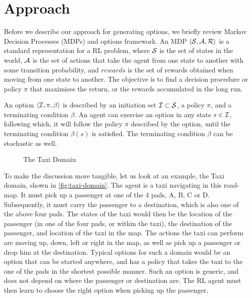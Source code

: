 \section{Approach}
\label{sec:approach}

Before we describe our approach for generating options, we briefly review Markov
Decision Processes (MDPs) and options framework. An MDP $\langle 
    \mathcal{S},\mathcal{A},\mathcal{R}  \rangle$ is a standard representation for a RL problem,
where $\mathcal{S}$ is the set of states in the world, $\mathcal{A}$ is the set of
actions that take the agent from one state to another with some transition
probability, and $rewards$ is the set of rewards obtained when moving from one
state to another. The objective is to find a decision procedure or policy $\pi$
that maximises the return, or the rewards accumulated in the long run. 

An option $\langle  \mathcal{I},\pi,\beta \rangle$ is described by an initiation set $\mathcal{I} \subset
\mathcal{S}$, a policy $\pi$, and a terminating condition $\beta$. An agent can
exercise an option in any state $s \in \mathcal{I}$, following which, it will
follow the policy $\pi$ described by the option, until the terminating condition
$\beta(s)$ is satisfied. The terminating condition $\beta$ can be stochastic as
well. 


\begin{figure}[h]
    \center
    
    \caption{The Taxi Domain}
    \label{fig:taxi-domain}
\end{figure}

To make the discussion more tangible, let us look at an example, the Taxi
domain, shown in \autoref{fig:taxi-domain}. The agent is a taxi navigating in
this road-map. It must pick up a passenger at one of the 4 pads, A, B, C or D.
Subsequently, it must carry the passenger to a destination, which is also one of
the above four pads. The states of the taxi would then be the location of the
passenger (in one of the four pads, or within the taxi), the destination of the
passenger, and location of the taxi in the map. The actions the taxi can perform
are moving up, down, left or right in the map, as well as pick up a passenger or
drop him at the destination.  Typical options for such a domain would be an
option that can be started anywhere, and has a policy that takes the taxi to the
one of the pads in the shortest possible manner. Such an option is generic, and
does not depend on where the passenger or destination are. The RL agent must
then learn to choose the right option when picking up the passenger.

